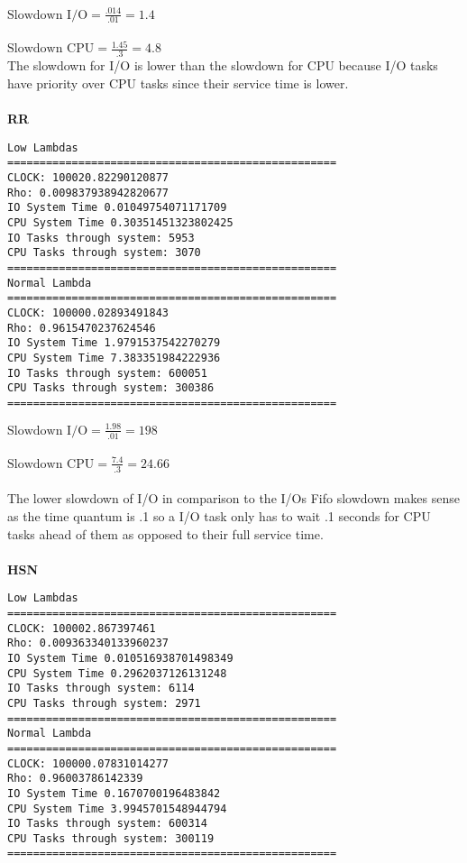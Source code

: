 \documentclass{article}
\theoremstyle{problemstyle}
\begin{document}
$\text{Slowdown I/O} = \frac{.014}{.01} = 1.4$\\\\
$\text{Slowdown CPU} = \frac{1.45}{.3} = 4.8$\\

The slowdown for I/O is lower than the slowdown for CPU because I/O tasks have priority over CPU tasks since their service time is lower.
\\\\
\newpage
\textbf{RR}
\begin{lstlisting}[breaklines]
Low Lambdas
===================================================
CLOCK: 100020.82290120877
Rho: 0.009837938942820677
IO System Time 0.01049754071171709
CPU System Time 0.30351451323802425
IO Tasks through system: 5953
CPU Tasks through system: 3070
===================================================
Normal Lambda
===================================================
CLOCK: 100000.02893491843
Rho: 0.9615470237624546
IO System Time 1.9791537542270279
CPU System Time 7.383351984222936
IO Tasks through system: 600051
CPU Tasks through system: 300386
===================================================
\end{lstlisting}

$\text{Slowdown I/O} = \frac{1.98}{.01} = 198$\\\\
$\text{Slowdown CPU} = \frac{7.4}{.3} = 24.66$\\
\\
The lower slowdown of I/O in comparison to the I/Os Fifo slowdown makes sense as the time quantum is .1 so a I/O task only has to wait .1 seconds for CPU tasks ahead of them as opposed to their full service time.
\\\\
\newpage
\textbf{HSN}
\begin{lstlisting}[breaklines]
Low Lambdas
===================================================
CLOCK: 100002.867397461
Rho: 0.009363340133960237
IO System Time 0.010516938701498349
CPU System Time 0.2962037126131248
IO Tasks through system: 6114
CPU Tasks through system: 2971
===================================================
Normal Lambda
===================================================
CLOCK: 100000.07831014277
Rho: 0.96003786142339
IO System Time 0.1670700196483842
CPU System Time 3.9945701548944794
IO Tasks through system: 600314
CPU Tasks through system: 300119
===================================================
\end{lstlisting}
\end{document}
